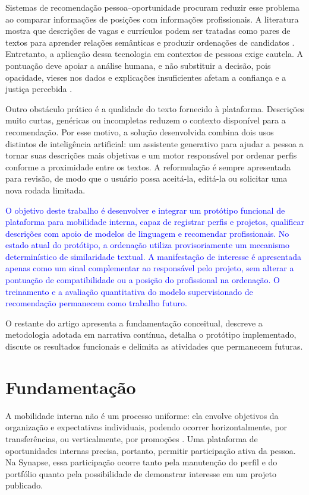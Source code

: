 \documentclass[12pt]{article}
\begin{document}
Sistemas de recomendação pessoa--oportunidade procuram reduzir esse problema ao comparar informações de posições com informações profissionais. A literatura mostra que descrições de vagas e currículos podem ser tratadas como pares de textos para aprender relações semânticas e produzir ordenações de candidatos \cite{bian2019domain}. Entretanto, a aplicação dessa tecnologia em contextos de pessoas exige cautela. A pontuação deve apoiar a análise humana, e não substituir a decisão, pois opacidade, vieses nos dados e explicações insuficientes afetam a confiança e a justiça percebida \cite{tang2025explainable}.

Outro obstáculo prático é a qualidade do texto fornecido à plataforma. Descrições muito curtas, genéricas ou incompletas reduzem o contexto disponível para a recomendação. Por esse motivo, a solução desenvolvida combina dois usos distintos de inteligência artificial: um assistente generativo para ajudar a pessoa a tornar suas descrições mais objetivas e um motor responsável por ordenar perfis conforme a proximidade entre os textos. A reformulação é sempre apresentada para revisão, de modo que o usuário possa aceitá-la, editá-la ou solicitar uma nova rodada limitada.

\textcolor{blue}{O objetivo deste trabalho é desenvolver e integrar um protótipo funcional de plataforma para mobilidade interna, capaz de registrar perfis e projetos, qualificar descrições com apoio de modelos de linguagem e recomendar profissionais. No estado atual do protótipo, a ordenação utiliza provisoriamente um mecanismo determinístico de similaridade textual. A manifestação de interesse é apresentada apenas como um sinal complementar ao responsável pelo projeto, sem alterar a pontuação de compatibilidade ou a posição do profissional na ordenação. O treinamento e a avaliação quantitativa do modelo supervisionado de recomendação permanecem como trabalho futuro.}

O restante do artigo apresenta a fundamentação conceitual, descreve a metodologia adotada em narrativa contínua, detalha o protótipo implementado, discute os resultados funcionais e delimita as atividades que permanecem futuras.

\section{Fundamentação}

A mobilidade interna não é um processo uniforme: ela envolve objetivos da organização e expectativas individuais, podendo ocorrer horizontalmente, por transferências, ou verticalmente, por promoções \cite{ray2024internal}. Uma plataforma de oportunidades internas precisa, portanto, permitir participação ativa da pessoa. Na Synapse, essa participação ocorre tanto pela manutenção do perfil e do portfólio quanto pela possibilidade de demonstrar interesse em um projeto publicado.
\end{document}
